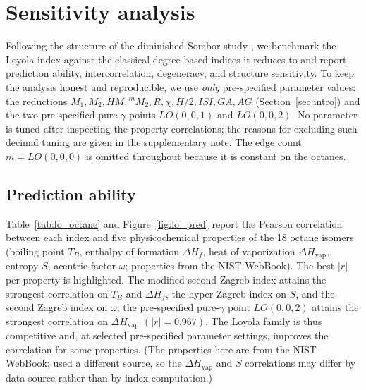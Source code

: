 \section{Sensitivity analysis}\label{sec:sensitivity}

Following the structure of the diminished-Sombor study
\cite{MovahediGutmanRedzepovicFurtula2026}, we benchmark the Loyola index against
the classical degree-based indices it reduces to and report prediction ability,
intercorrelation, degeneracy, and structure sensitivity. To keep the analysis
honest and reproducible, we use \emph{only} pre-specified parameter values: the
reductions $M_1,M_2,HM,{}^mM_2,R,\chi,H/2,ISI,GA,AG$ (Section~\ref{sec:intro}) and
the two pre-specified pure-$\gamma$ points $LO(0,0,1)$ and $LO(0,0,2)$. No
parameter is tuned after inspecting the property correlations; the reasons for
excluding such decimal tuning are given in the supplementary note. The edge count
$m=LO(0,0,0)$ is omitted throughout because it is constant on the octanes.

\subsection{Prediction ability}\label{sub:prediction}
Table~\ref{tab:lo_octane} and Figure~\ref{fig:lo_pred} report the Pearson
correlation between each index and five physicochemical properties of the 18
octane isomers (boiling point $T_B$, enthalpy of formation $\Delta H_f$, heat of
vaporization $\Delta H_{\mathrm{vap}}$, entropy $S$, acentric factor $\omega$;
properties from the NIST WebBook). The best $|r|$ per property is highlighted. The
modified second Zagreb index attains the strongest correlation on $T_B$ and
$\Delta H_f$, the hyper-Zagreb index on $S$, and the second Zagreb index on
$\omega$; the pre-specified pure-$\gamma$ point $LO(0,0,2)$ attains the strongest
correlation on $\Delta H_{\mathrm{vap}}$ $(|r|=0.967)$. The Loyola family is thus
competitive and, at selected pre-specified parameter settings, improves the
correlation for some properties. (The properties here are from the NIST WebBook;
\cite{MovahediGutmanRedzepovicFurtula2026} used a different source, so the
$\Delta H_{\mathrm{vap}}$ and $S$ correlations may differ by data source rather
than by index computation.)

